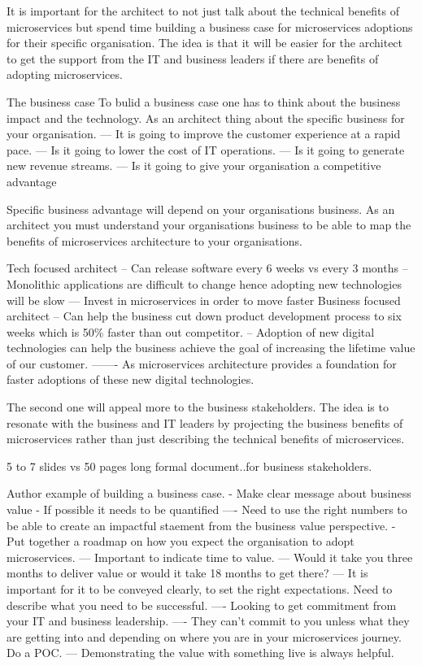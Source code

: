 It is important for the architect to not just talk about the technical benefits of microservices but spend time building a business case for microservices adoptions for their specific organisation.
The idea is that it will be easier for the architect to get the support from the IT and business leaders if there are benefits of adopting microservices.

The business case
To bulid a business case one has to think about the business impact and the technology.
As an architect thing about the specific business for your organisation.
--- It is going to improve the customer experience at a rapid pace.
--- Is it going to lower the cost of IT operations.
--- Is it going to generate new revenue streams.
--- Is it going to give your organisation a competitive advantage

Specific business advantage will depend on your organisations business.
As an architect you must understand your organisations business to be able to map the benefits of microservices architecture to your organisations.

Tech focused architect
-- Can release software every 6 weeks vs every 3 months
-- Monolithic applications are difficult to change hence adopting new technologies will be slow
--- Invest in microservices in order to move faster
Business focused architect
-- Can help the business cut down product development process to six weeks which is 50\% faster than out competitor.
-- Adoption of new digital technologies can help the business achieve the goal of increasing the lifetime value of our customer.
------- As microservices architecture provides a foundation for faster adoptions of these new digital technologies.

The second one will appeal more to the business stakeholders.
The idea is to resonate with the business and IT leaders by projecting the business benefits of microservices rather than just describing the technical benefits of microservices.

5 to 7 slides vs 50 pages long formal document..for business stakeholders.

Author example of building a business case.
- Make clear message about business value
- If possible it needs to be quantified
---- Need to use the right numbers to be able to create an impactful staement from the business value perspective.
- Put together a roadmap on how you expect the organisation to adopt microservices.
--- Important to indicate time to value.
--- Would it take you three months to deliver value or would it take 18 months to get there?
--- It is important for it to be conveyed clearly, to set the right expectations. Need to describe what you need to be successful.
---- Looking to get commitment from your IT and business leadership.
---- They can't commit to you unless what they are getting into and depending on where you are in your microservices journey. Do a POC.
--- Demonstrating the value with something live is always helpful.

